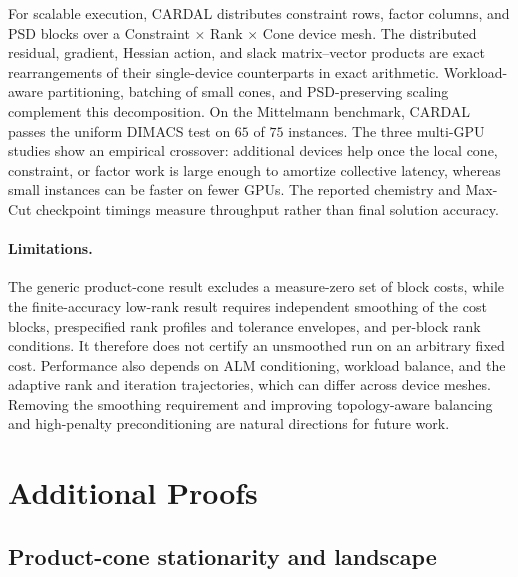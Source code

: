 \documentclass[11pt]{article}
\theoremstyle{definition}
\theoremstyle{remark}
\newcommand{\name}{\textsc{CARDAL}\xspace}
\begin{document}
For scalable execution, \name{} distributes constraint rows, factor columns,
and PSD blocks over a Constraint $\times$ Rank $\times$ Cone device mesh.
The distributed residual, gradient, Hessian action, and slack
matrix--vector products are exact rearrangements of their single-device
counterparts in exact arithmetic.  Workload-aware partitioning, batching of
small cones, and PSD-preserving scaling complement this decomposition.  On
the Mittelmann benchmark, \name{} passes the uniform DIMACS test on $65$ of
$75$ instances.  The three multi-GPU studies show an empirical crossover:
additional devices help once the local cone, constraint, or factor work is
large enough to amortize collective latency, whereas small instances can be
faster on fewer GPUs.  The reported chemistry and Max-Cut checkpoint timings
measure throughput rather than final solution accuracy.

\paragraph{Limitations.}  The generic product-cone result excludes a
measure-zero set of block costs, while the finite-accuracy low-rank result
requires independent smoothing of the cost blocks, prespecified rank profiles
and tolerance envelopes, and per-block rank conditions.  It therefore does
not certify an unsmoothed run on an arbitrary fixed cost.  Performance also
depends on ALM conditioning, workload balance, and the
adaptive rank and iteration trajectories, which can differ across device
meshes.  Removing the smoothing requirement and improving topology-aware
balancing and high-penalty preconditioning are natural directions for future
work.

\begingroup
\footnotesize
\setlength{\bibsep}{0pt}


\endgroup
\appendix
\section{Additional Proofs}
\label{app:additional-proofs}

\subsection{Product-cone stationarity and landscape}
\end{document}
